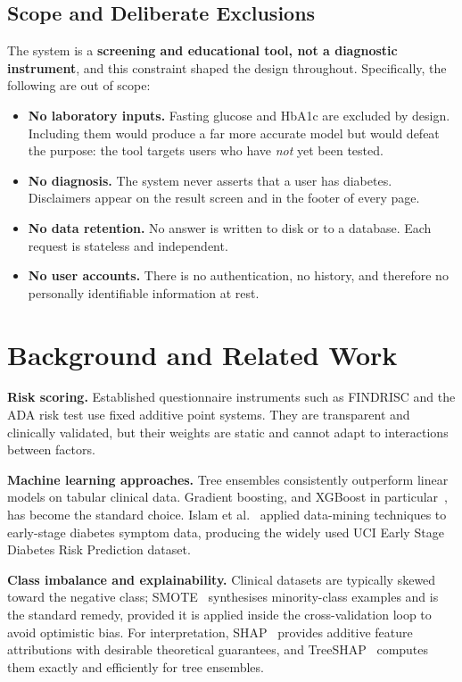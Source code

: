 \documentclass[11pt,a4paper]{article}
\begin{document}
\subsection{Scope and Deliberate Exclusions}
The system is a \textbf{screening and educational tool, not a diagnostic
instrument}, and this constraint shaped the design throughout. Specifically,
the following are out of scope:

\begin{itemize}
  \item \textbf{No laboratory inputs.} Fasting glucose and HbA1c are excluded
        by design. Including them would produce a far more accurate model but
        would defeat the purpose: the tool targets users who have \emph{not}
        yet been tested.
  \item \textbf{No diagnosis.} The system never asserts that a user has
        diabetes. Disclaimers appear on the result screen and in the footer of
        every page.
  \item \textbf{No data retention.} No answer is written to disk or to a
        database. Each request is stateless and independent.
  \item \textbf{No user accounts.} There is no authentication, no history, and
        therefore no personally identifiable information at rest.
\end{itemize}

\section{Background and Related Work}

\textbf{Risk scoring.} Established questionnaire instruments such as FINDRISC
and the ADA risk test use fixed additive point systems. They are transparent
and clinically validated, but their weights are static and cannot adapt to
interactions between factors.

\textbf{Machine learning approaches.} Tree ensembles consistently outperform
linear models on tabular clinical data. Gradient boosting, and XGBoost in
particular~\cite{xgboost}, has become the standard choice. Islam et
al.~\cite{islam2020} applied data-mining techniques to early-stage diabetes
symptom data, producing the widely used UCI Early Stage Diabetes Risk
Prediction dataset.

\textbf{Class imbalance and explainability.} Clinical datasets are typically
skewed toward the negative class; SMOTE~\cite{smote} synthesises minority-class
examples and is the standard remedy, provided it is applied inside the
cross-validation loop to avoid optimistic bias. For interpretation,
SHAP~\cite{shap} provides additive feature attributions with desirable
theoretical guarantees, and TreeSHAP~\cite{treeshap} computes them exactly and
efficiently for tree ensembles.
\end{document}
